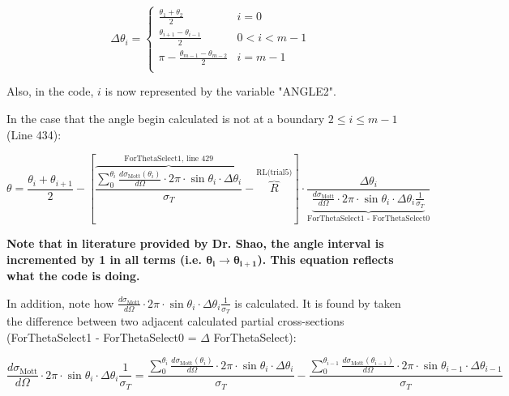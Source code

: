\documentclass[10pt, reqno]{exam}
\begin{document}
\begin{equation}
    \Delta \theta_i = \begin{cases}
        \frac{\theta_{1} + \theta_{2}}{2} &i = 0 \\
        \frac{\theta_{i + 1} - \theta_{i - 1}}{2} &0 < i < m - 1 \\
        \pi - \frac{\theta_{m - 1} - \theta_{m - 2}}{2} &i = m - 1 \\
    \end{cases}
\end{equation}

Also, in the code, $i$ is now represented by the variable "ANGLE2".\par

\vspace{0.5 cm}

In the case that the angle begin calculated is not at a boundary $2 \le i \le m - 1$ (Line 434): \par

\begin{equation}
        \theta = \frac{\theta_{i} + \theta_{i + 1}}{2} - \left[ \overbrace{\boxed{\frac{\sum_0^{\theta_{i}}\frac{d\sigma_{\text{Mott}}(\theta_{i})}{d\Omega}\cdot 2\pi\cdot \sin\theta_{i}\cdot \Delta \theta_{i}}{\sigma_T}}}^{\text{ForThetaSelect1, line 429}} - \overbrace{\boxed{R}}^{\text{RL(trial5)}} \right]\cdot \frac{\Delta \theta_{i}}{\underbrace{\boxed{\frac{d\sigma_{\text{Mott}}}{d\Omega} \cdot 2\pi \cdot\sin\theta_{i}\cdot \Delta \theta_{i}\frac{1}{\sigma_T}}}_{\text{ForThetaSelect1 - ForThetaSelect0}}}
\end{equation}

\textbf{Note that in literature provided by Dr. Shao, the angle interval is incremented by 1 in all terms (i.e. $\bm{\theta_i \rightarrow \theta_{i + 1}}$). This equation reflects what the code is doing.} \par

\vspace{0.5 cm}

In addition, note how $\frac{d\sigma_{\text{Mott}}}{d\Omega} \cdot 2\pi \cdot\sin\theta_{i}\cdot \Delta \theta_{i}\frac{1}{\sigma_T}$ is calculated. It is found by taken the difference between two adjacent calculated partial cross-sections (ForThetaSelect1 - ForThetaSelect0 = $\Delta$ ForThetaSelect): \par

\begin{equation}
    \frac{d\sigma_{\text{Mott}}}{d\Omega} \cdot 2\pi \cdot\sin\theta_{i}\cdot \Delta \theta_{i}\frac{1}{\sigma_T}  = \frac{\sum_0^{\theta_{i}}\frac{d\sigma_{\text{Mott}}(\theta_{i})}{d\Omega}\cdot 2\pi\cdot \sin\theta_{i}\cdot \Delta \theta_{i}}{\sigma_T} - \frac{\sum_0^{\theta_{i-1}}\frac{d\sigma_{\text{Mott}}(\theta_{i-1})}{d\Omega}\cdot 2\pi\cdot \sin\theta_{i-1}\cdot \Delta \theta_{i-1}}{\sigma_T}
\end{equation}
\end{document}
